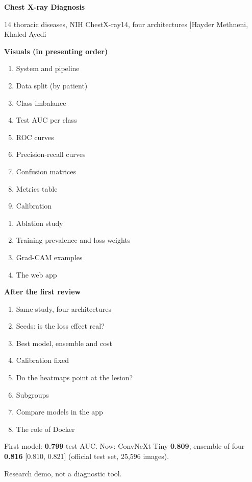 \documentclass[11pt,a4paper,landscape]{article}
\begin{document}
\thispagestyle{empty}
{\Huge\bfseries Chest X-ray Diagnosis}\par\vspace{0.4em}
{\large 14 thoracic diseases, NIH ChestX-ray14, four architectures \quad|\quad Hayder Methneni, Khaled Ayedi}\par\vspace{1.2em}

{\large\bfseries Visuals (in presenting order)}\par\vspace{0.3em}
\begin{minipage}[t]{0.48\textwidth}
\begin{enumerate}\setlength{\itemsep}{1pt}
  \item System and pipeline
  \item Data split (by patient)
  \item Class imbalance
  \item Test AUC per class
  \item ROC curves
  \item Precision-recall curves
  \item Confusion matrices
  \item Metrics table
  \item Calibration
\end{enumerate}
\end{minipage}\hfill
\begin{minipage}[t]{0.48\textwidth}
\begin{enumerate}\setlength{\itemsep}{1pt}\setcounter{enumi}{9}
  \item Ablation study
  \item Training prevalence and loss weights
  \item Grad-CAM examples
  \item The web app
\end{enumerate}
{\bfseries After the first review}
\begin{enumerate}\setlength{\itemsep}{1pt}\setcounter{enumi}{13}
  \item Same study, four architectures
  \item Seeds: is the loss effect real?
  \item Best model, ensemble and cost
  \item Calibration fixed
  \item Do the heatmaps point at the lesion?
  \item Subgroups
  \item Compare models in the app
  \item The role of Docker
\end{enumerate}
\vspace{0.8em}
\small First model: \textbf{0.799} test AUC. Now: ConvNeXt-Tiny \textbf{0.809}, ensemble of four \textbf{0.816} [0.810, 0.821] (official test set, 25,596 images).\par
Research demo, not a diagnostic tool.
\end{minipage}
\end{document}
